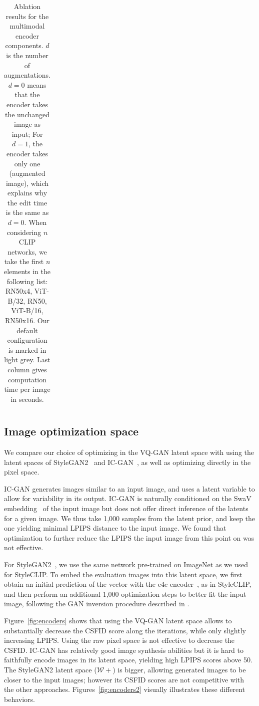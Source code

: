 \begin{table}[H]
\begin{tabular}{lrrrrrr}
\end{tabular}

\caption{\label{table:runtime} Ablation results for the multimodal encoder components. $d$ is the number of augmentations. 
$d=0$ means that the encoder takes the unchanged image as input; For $d=1$, the encoder takes only one (augmented image), 
which explains why the edit time is the same as $d=0$.
When considering $n$ \ac{CLIP} networks, we take the first $n$ elements in the following list: RN50x4, ViT-B/32, RN50, 
ViT-B/16, RN50x16. 
Our default configuration  is marked in light grey. 
Last column gives computation time per image in seconds.
}

\end{table}


\subsection{Image optimization space} 
We compare our choice of optimizing in the VQ-GAN latent space with using the latent
 spaces of StyleGAN2~\citep{karra2020stylegan2} and IC-GAN~\citep{casanova21nips}, as well as 
 optimizing directly in the pixel space.

IC-GAN  generates images similar to an input image, 
and uses  a latent variable to allow for variability in its output. 
IC-GAN is naturally conditioned on the SwaV embedding~\citep{caron20nips} of the input image
but does not offer direct  inference of the latents  for a given image. We thus take 
1,000 samples from the latent prior, and keep the one yielding minimal \ac{LPIPS} distance 
to the input image. We found that  optimization to further reduce the \ac{LPIPS}  \wrt the input image from this
 point on was not effective.

For StyleGAN2~\citep{karra2020stylegan2}, we use the same  network  pre-trained on ImageNet 
as we used for StyleCLIP.
To embed the evaluation images into this latent space, we first obtain an initial 
prediction of the vector with the e4e encoder~\citep{tov2021designing}, as in StyleCLIP, 
and then  perform an additional 1,000  optimization steps to better fit the input 
image, following the \ac{GAN} inversion procedure described in \cite{karra2019stylegan}.

Figure~\ref{fig:encoders} shows that using the VQ-GAN latent space allows 
to substantially decrease the  \ac{CSFID} score along the iterations, while only slightly 
increasing \ac{LPIPS}. 
Using the raw pixel space is not effective to decrease the \ac{CSFID}. 
IC-GAN has relatively good image synthesis abilities but it is hard to faithfully
 encode images in its latent space, yielding high \ac{LPIPS} scores above 50. 
The StyleGAN2 latent space ($\mathcal{W+}$) is bigger, allowing generated images to 
be closer to the input images; however its \ac{CSFID} scores are not competitive with the 
other approaches. Figures~\ref{fig:encoders2} visually illustrates these different behaviors.


